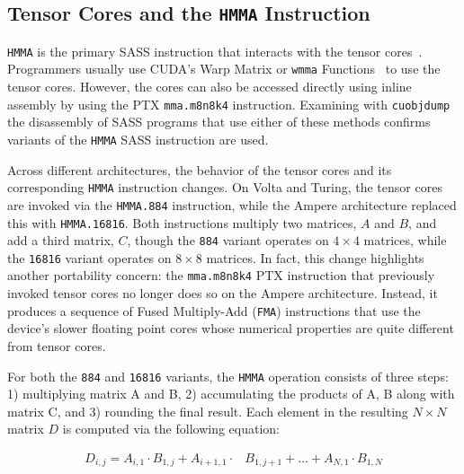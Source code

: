 \subsection{Tensor Cores and the \texttt{HMMA} Instruction}
\label{sec:tcbg}





\texttt{HMMA} is the primary SASS instruction that interacts with the tensor cores~\cite{jia2018dissecting}.
Programmers usually use CUDA's Warp Matrix or \texttt{wmma} Functions~\cite[\S7.24]{cuda-c-programming} to use the tensor cores.
However, the cores can also be accessed directly using inline assembly by using the PTX \texttt{mma.m8n8k4} instruction. 
Examining with \texttt{cuobjdump}~\cite{BinaryUtilities} the disassembly of SASS programs that use either of these methods confirms variants of the \texttt{HMMA} SASS instruction are used.


 



Across different architectures, the behavior of the tensor cores and its corresponding \texttt{HMMA} instruction changes. On Volta and Turing, the tensor cores are invoked via the \texttt{HMMA.884} instruction, while the Ampere architecture replaced this with \texttt{HMMA.16816}. Both instructions multiply two matrices, $A$ and $B$, and add a third matrix, $C$, though the \texttt{884} variant operates on $4\times4$ matrices, while the \texttt{16816} variant operates on $8\times8$ matrices. In fact, this change highlights another portability concern: the \texttt{mma.m8n8k4} PTX instruction that previously invoked tensor cores no longer does so on the Ampere architecture. Instead, it produces a sequence of Fused Multiply-Add (\texttt{FMA}) instructions that use the device's slower floating point cores whose numerical properties are quite different from tensor cores.

For both the \texttt{884} and \texttt{16816} variants, the \texttt{HMMA} operation consists of three steps: 1) multiplying matrix A and B, 2) accumulating the products of A, B along with matrix C, and 3) rounding the final result.  Each element in the resulting $N\times N$ matrix $D$ is computed via the following equation:

\begin{equation}\label{eq:matrix-mul-formula}
\begin{split}
    D_{i,j} = A_{i,1}\cdot B_{1,j} + A_{i+1,1}\cdot &B_{1,j+1} + \ldots + A_{N, 1}\cdot B_{1, N}
    \end{split}
\end{equation}


